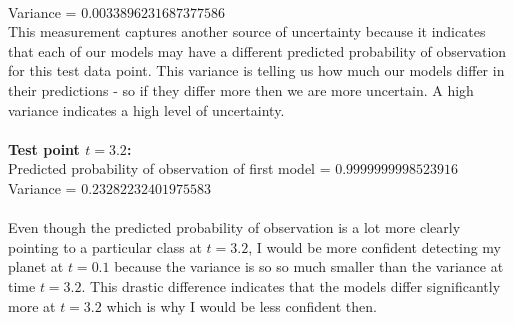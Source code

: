 \documentclass[submit]{harvardml}
\begin{document}
\begin{enumerate}
     \\
     Variance = $0.0033896231687377586$\\
     This measurement captures another source of uncertainty because it indicates that each of our models may have a different predicted probability of observation for this test data point. This variance is telling us how much our models differ in their predictions - so if they differ more then we are more uncertain. A high variance indicates a high level of uncertainty.\\
     \\ 
    \textbf{Test point $t=3.2$:}\\
    Predicted probability of observation of first model = $0.9999999998523916$\\
    Variance = $0.23282232401975583$\\
    \\
    Even though the predicted probability of observation is a lot more clearly pointing to a particular class at $t=3.2$, I would be more confident detecting my planet at $t=0.1$ because the variance is so so much smaller than the variance at time $t=3.2$. This drastic difference indicates that the models differ significantly more at $t=3.2$ which is why I would be less confident then.\\

     
 \end{enumerate}

\end{document}
